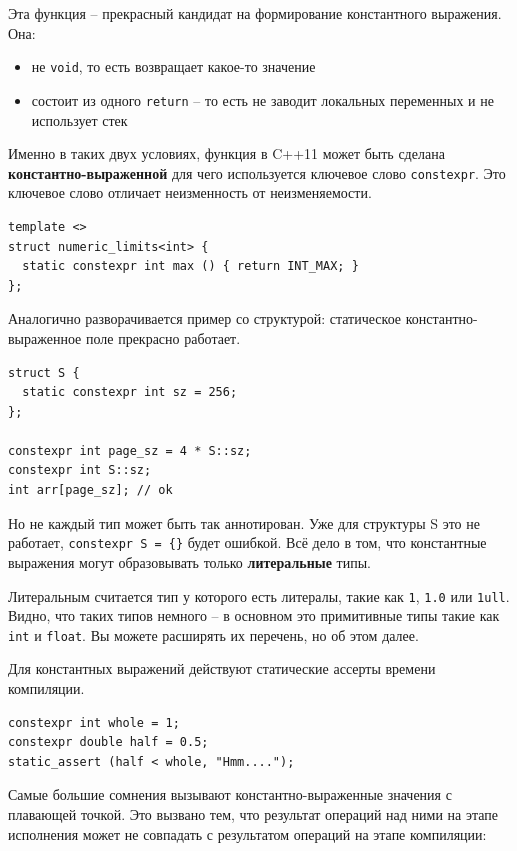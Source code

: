 \documentclass[a4paper,12pt,oneside]{article}
\begin{document}
Эта функция -- прекрасный кандидат на формирование константного выражения. Она:
\begin{itemize}
\item не \lstinline!void!, то есть возвращает какое-то значение
\item состоит из одного \lstinline!return! -- то есть не заводит локальных переменных и не использует стек
\end{itemize}

Именно в таких двух условиях, функция в C++11 может быть сделана \textbf{константно-выраженной} для чего используется ключевое слово \lstinline!constexpr!. Это ключевое слово отличает неизменность от неизменяемости.

\begin{lstlisting}
template <>
struct numeric_limits<int> {
  static constexpr int max () { return INT_MAX; }
};
\end{lstlisting}

Аналогично разворачивается пример со структурой: статическое константно-выраженное поле прекрасно работает.

\begin{lstlisting}
struct S { 
  static constexpr int sz = 256; 
};

constexpr int page_sz = 4 * S::sz;
constexpr int S::sz;
int arr[page_sz]; // ok
\end{lstlisting}

Но не каждый тип может быть так аннотирован. Уже для структуры S это не работает, \lstinline!constexpr S = {}! будет ошибкой. Всё дело в том, что константные выражения могут образовывать только \textbf{литеральные} типы.

Литеральным считается тип у которого есть литералы, такие как \lstinline!1!, \lstinline!1.0! или \lstinline!1ull!. Видно, что таких типов немного -- в основном это примитивные типы такие как \lstinline!int! и \lstinline!float!. Вы можете расширять их перечень, но об этом далее.

Для константных выражений действуют статические ассерты времени компиляции.

\begin{lstlisting}
constexpr int whole = 1; 
constexpr double half = 0.5;
static_assert (half < whole, "Hmm....");
\end{lstlisting}

Самые большие сомнения вызывают константно-выраженные значения с плавающей точкой. Это вызвано тем, что результат операций над ними на этапе исполнения может не совпадать с результатом операций на этапе компиляции:
\end{document}
